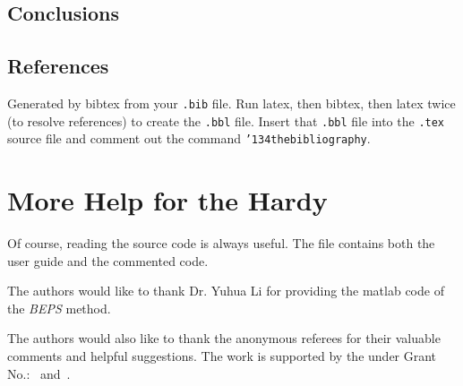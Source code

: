 \documentclass[sigconf]{acmart}
\begin{document}
\subsection{Conclusions}
\subsection{References}

Generated by bibtex from your \texttt{.bib} file.  Run latex, then
bibtex, then latex twice (to resolve references) to create the
\texttt{.bbl} file.  Insert that \texttt{.bbl} file into the
\texttt{.tex} source file and comment out the command
\texttt{{\char'134}thebibliography}.


\section{More Help for the Hardy}

Of course, reading the source code is always useful.  The file
 contains both the user guide and the commented code.

\begin{acks}

  The authors would like to thank Dr. Yuhua Li for providing the
  matlab code of the \textit{BEPS} method.

  The authors would also like to thank the anonymous referees for
  their valuable comments and helpful suggestions. The work is
  supported by the  under Grant
  No.:~
  and~.

\end{acks}


 
\end{document}
